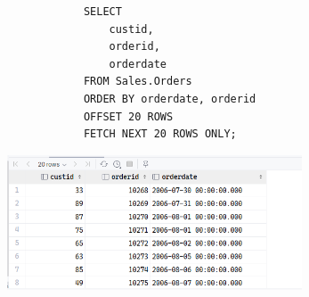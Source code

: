 \documentclass[12pt,titlepage]{article}
\begin{document}
\begin{enumerate}
{        \begin{verbatim}
            SELECT
                custid,
                orderid,
                orderdate
            FROM Sales.Orders
            ORDER BY orderdate, orderid
            OFFSET 20 ROWS
            FETCH NEXT 20 ROWS ONLY;
        \end{verbatim}

        \begin{center}
            \includegraphics[height=4cm]{./images/p8-n2.png}
        \end{center}
    }
\end{enumerate}
\end{document}
